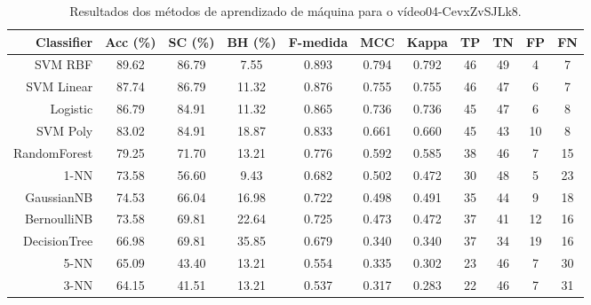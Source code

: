 \begin{table}[!htb]
\centering
\caption{Resultados dos métodos de aprendizado de máquina para o vídeo04-CevxZvSJLk8.}
\label{tab:04-CevxZvSJLk8}
\begin{tabular}{r|c|c|c|c|c|c|c|c|c|c}
\hline\hline
Classifier & Acc (\%) & SC (\%) & BH (\%) & F-medida & MCC & Kappa & TP & TN & FP & FN \\ \hline
SVM RBF & 89.62 & 86.79 & 7.55 & 0.893 & 0.794 & 0.792 & 46 & 49 & 4 & 7 \\ 
SVM Linear & 87.74 & 86.79 & 11.32 & 0.876 & 0.755 & 0.755 & 46 & 47 & 6 & 7 \\ 
Logistic & 86.79 & 84.91 & 11.32 & 0.865 & 0.736 & 0.736 & 45 & 47 & 6 & 8 \\ 
SVM Poly & 83.02 & 84.91 & 18.87 & 0.833 & 0.661 & 0.660 & 45 & 43 & 10 & 8 \\ 
RandomForest & 79.25 & 71.70 & 13.21 & 0.776 & 0.592 & 0.585 & 38 & 46 & 7 & 15 \\ 
1-NN & 73.58 & 56.60 & 9.43 & 0.682 & 0.502 & 0.472 & 30 & 48 & 5 & 23 \\ 
GaussianNB & 74.53 & 66.04 & 16.98 & 0.722 & 0.498 & 0.491 & 35 & 44 & 9 & 18 \\ 
BernoulliNB & 73.58 & 69.81 & 22.64 & 0.725 & 0.473 & 0.472 & 37 & 41 & 12 & 16 \\ 
DecisionTree & 66.98 & 69.81 & 35.85 & 0.679 & 0.340 & 0.340 & 37 & 34 & 19 & 16 \\ 
5-NN & 65.09 & 43.40 & 13.21 & 0.554 & 0.335 & 0.302 & 23 & 46 & 7 & 30 \\ 
3-NN & 64.15 & 41.51 & 13.21 & 0.537 & 0.317 & 0.283 & 22 & 46 & 7 & 31 \\ 
\hline\hline
\end{tabular}
\end{table}
